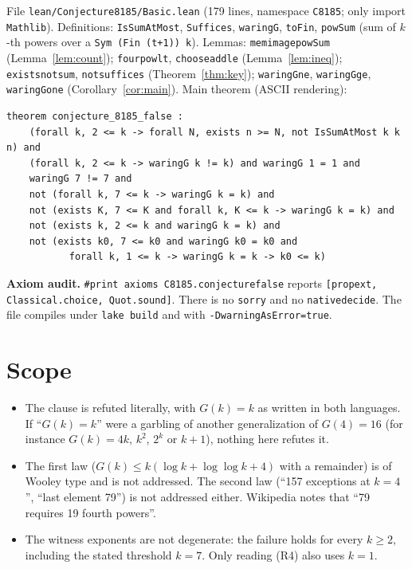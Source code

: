 \documentclass[11pt]{article}
\renewcommand{\_}{\oldus\allowbreak}
\theoremstyle{definition}
\begin{document}
File \texttt{lean/Conjecture8185/Basic.lean} (179 lines, namespace \texttt{C8185}; only import
\texttt{Mathlib}). Definitions: \texttt{IsSumAtMost}, \texttt{Suffices}, \texttt{waringG},
\texttt{toFin}, \texttt{powSum} (sum of $k$-th powers over a \texttt{Sym (Fin (t+1)) k}). Lemmas:
\texttt{mem\_image\_powSum} (Lemma~\ref{lem:count}); \texttt{four\_pow\_lt}, \texttt{choose\_add\_le}
(Lemma~\ref{lem:ineq}); \texttt{exists\_not\_sum}, \texttt{not\_suffices} (Theorem~\ref{thm:key});
\texttt{waringG\_ne}, \texttt{waringG\_ge}, \texttt{waringG\_one} (Corollary~\ref{cor:main}). Main theorem
(ASCII rendering):

\begin{verbatim}
theorem conjecture_8185_false :
    (forall k, 2 <= k -> forall N, exists n >= N, not IsSumAtMost k k n) and
    (forall k, 2 <= k -> waringG k != k) and waringG 1 = 1 and
    waringG 7 != 7 and
    not (forall k, 7 <= k -> waringG k = k) and
    not (exists K, 7 <= K and forall k, K <= k -> waringG k = k) and
    not (exists k, 2 <= k and waringG k = k) and
    not (exists k0, 7 <= k0 and waringG k0 = k0 and
           forall k, 1 <= k -> waringG k = k -> k0 <= k)
\end{verbatim}

\textbf{Axiom audit.} \texttt{\#print axioms C8185.conjecture\_8185\_false} reports
\texttt{[propext, Classical.choice, Quot.sound]}. There is no \texttt{sorry} and no
\texttt{native\_decide}. The file compiles under \texttt{lake build} and with
\texttt{-DwarningAsError=true}.

\section{Scope}

\begin{itemize}
\item The clause is refuted literally, with $G(k) = k$ as written in both languages. If ``$G(k) = k$''
were a garbling of another generalization of $G(4) = 16$ (for instance $G(k) = 4k$, $k^2$, $2^k$ or
$k+1$), nothing here refutes it.
\item The first law ($G(k) \le k(\log k + \log\log k + 4)$ with a remainder) is of Wooley type and is
not addressed. The second law (``157 exceptions at $k=4$'', ``last element 79'') is not addressed
either. Wikipedia notes that ``79 requires 19 fourth powers''.
\item The witness exponents are not degenerate: the failure holds for every $k \ge 2$, including the
stated threshold $k = 7$. Only reading (R4) also uses $k = 1$.
\end{itemize}
\end{document}
